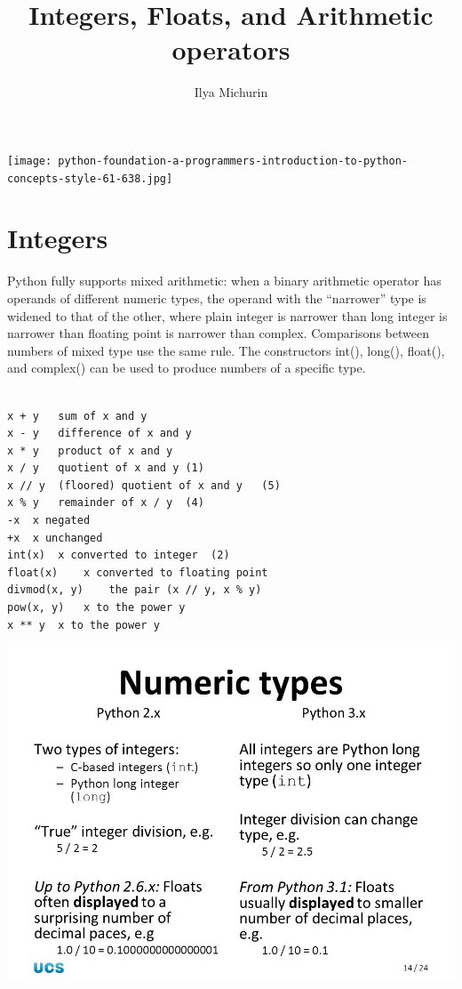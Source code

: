 \documentclass{tufte-handout}
\title{Integers, Floats, and Arithmetic operators }
\author[The Academy]{Ilya Michurin}
\begin{document}
\maketitle %

\begin{marginfigure}
  \texttt{[image: python-foundation-a-programmers-introduction-to-python-concepts-style-61-638.jpg]}
  \label{fig:marginfig}
\end{marginfigure}


\normalsize



\section{Integers}
Python fully supports mixed arithmetic: when a binary arithmetic operator has operands of different numeric types, the operand with the ``narrower'' type is widened to that of the other, where plain integer is narrower than long integer is narrower than floating point is narrower than complex. Comparisons between numbers of mixed type use the same rule. The constructors int(), long(), float(), and complex() can be used to produce numbers of a specific type.


\normalsize



\begin{framed}
\begin{verbatim}

x + y	sum of x and y	
x - y	difference of x and y	
x * y	product of x and y	
x / y	quotient of x and y	(1)
x // y	(floored) quotient of x and y	(5)
x % y	remainder of x / y	(4)
-x	x negated	
+x	x unchanged	
int(x)	x converted to integer	(2)
float(x)	x converted to floating point	
divmod(x, y)	the pair (x // y, x % y)	
pow(x, y)	x to the power y	
x ** y	x to the power y
\end{verbatim}
\end{framed}

\begin{marginfigure}
  \includegraphics[width=\linewidth]{slide_14.jpg}
  \label{fig:marginfig}
\end{marginfigure}
\end{document}
